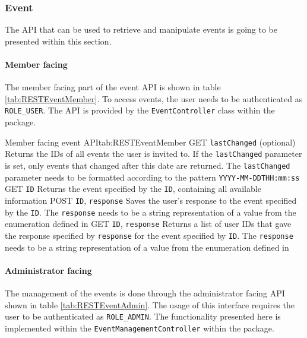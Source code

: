 \subsubsection{Event}

The \gls{API} that can be used to retrieve and manipulate events is going to be presented within this section. 

\paragraph{Member facing}
The member facing part of the event \gls{API} is shown in table \vref{tab:RESTEventMember}. To access events, the user needs to be authenticated as \texttt{ROLE\_USER}. The \gls{API} is provided by the \texttt{EventController} class within the  package.

\begin{RESTTable}{Member facing event API}{tab:RESTEventMember}
		{GET}
		{\texttt{lastChanged} (optional)}
		{Returns the IDs of all events the user is invited to. If the \texttt{lastChanged} parameter is set, only events that changed after this date are returned. The \texttt{lastChanged} parameter needs to be formatted according to the pattern \texttt{YYYY-MM-DDTHH:mm:ss}}
		{GET}
		{\texttt{ID}}
		{Returns the event specified by the \texttt{ID}, containing all available information}
		{POST}
		{\texttt{ID}, \texttt{response}}
		{Saves the user's response to the event specified by the \texttt{ID}. The \texttt{response} needs to be a string representation of a value from the enumeration defined in }
		{GET}
		{\texttt{ID}, \texttt{response}}
		{Returns a list of user IDs that gave the response specified by \texttt{response} for the event specified by \texttt{ID}. The \texttt{response} needs to be a string representation of a value from the enumeration defined in }
\end{RESTTable}

\paragraph{Administrator facing}
The management of the events is done through the administrator facing \gls{API} shown in table \vref{tab:RESTEventAdmin}. The usage of this interface requires the user to be authenticated as \texttt{ROLE\_ADMIN}. The functionality presented here is implemented within the \texttt{EventManagementController} within the  package.


